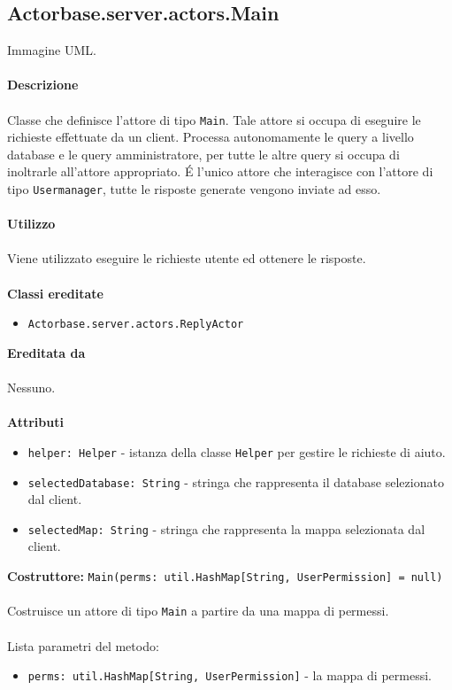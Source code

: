 \documentclass[a4paper]{article}
\begin{document}
	\subsection{Actorbase.server.actors.Main}
		Immagine UML.
		\\ \\
		\textbf{Descrizione}
			\\ \\
			Classe che definisce l'attore di tipo \texttt{Main}. Tale attore si occupa di eseguire le richieste effettuate da un client. Processa autonomamente le query a livello database e le query amministratore, per tutte le altre query si occupa di inoltrarle all'attore appropriato. \'E l'unico attore che interagisce con l'attore di tipo \texttt{Usermanager}, tutte le risposte generate vengono inviate ad esso.
			\\ \\
		\textbf{Utilizzo}
			\\ \\
			Viene utilizzato eseguire le richieste utente ed ottenere le risposte.
			\\ \\
		\textbf{Classi ereditate}
			\begin{itemize}
				\item \texttt{Actorbase.server.actors.ReplyActor}
			\end{itemize}
		\textbf{Ereditata da}
			\\ \\
			Nessuno.
			\\ \\
		\textbf{Attributi}
			\begin{itemize}
				\item \texttt{helper: Helper} - istanza della classe \texttt{Helper} per gestire le richieste di aiuto.
				\item \texttt{selectedDatabase: String} - stringa che rappresenta il database selezionato dal client.
				\item \texttt{selectedMap: String} - stringa che rappresenta la mappa selezionata dal client.
			\end{itemize}
		\textbf{Costruttore: }\texttt{Main(perms: util.HashMap[String, UserPermission] = null)}
			\\ \\
			Costruisce un attore di tipo \texttt{Main} a partire da una mappa di permessi.
			\\ \\
			Lista parametri del metodo:
			\begin{itemize}
				\item \texttt{perms: util.HashMap[String, UserPermission]} - la mappa di permessi.
			\end{itemize}
\end{document}
